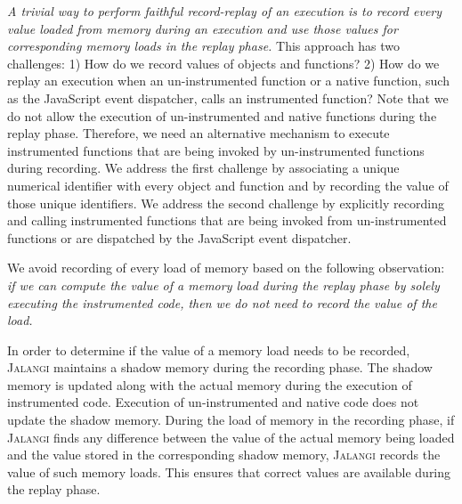 \documentclass{sig-alternate}
\def\jalangi{\textsc{Jalangi}}
\begin{document}
\emph{A trivial way to perform faithful record-replay of an execution
  is to record every value loaded from memory during an execution and
  use those values for corresponding memory loads in the replay
  phase.}  This approach has two challenges: 1) How do we record
values of objects and functions?  2) How do we replay an execution
when an un-instrumented function or a native function, such as the
JavaScript event dispatcher, calls an instrumented function?  Note
that we do not allow the execution of un-instrumented and native
functions during the replay phase.  Therefore, we need an alternative
mechanism to execute instrumented functions that are being invoked by
un-instrumented functions during recording.  We address the first
challenge by associating a unique numerical identifier with every
object and function and by recording the value of those unique
identifiers.  We address the second challenge by explicitly recording
and calling instrumented functions that are being invoked from
un-instrumented functions or are dispatched by the JavaScript event
dispatcher.

We avoid recording of every load of memory based on the following
observation: \emph{if we can compute the value of a memory load during
  the replay phase by solely executing the instrumented code, then we
  do not need to record the value of the load.}

In order to determine if the value of a memory load needs to be
recorded, \jalangi{} maintains a shadow memory during the recording
phase.  The shadow memory is updated along with the actual memory
during the execution of instrumented code.  Execution of
un-instrumented and native code does not update the shadow memory.
During the load of memory in the recording phase, if \jalangi{} finds
any difference between the value of the actual memory being loaded and
the value stored in the corresponding shadow memory, \jalangi{}
records the value of such memory loads. This ensures that correct
values are available during the replay phase.
\end{document}
